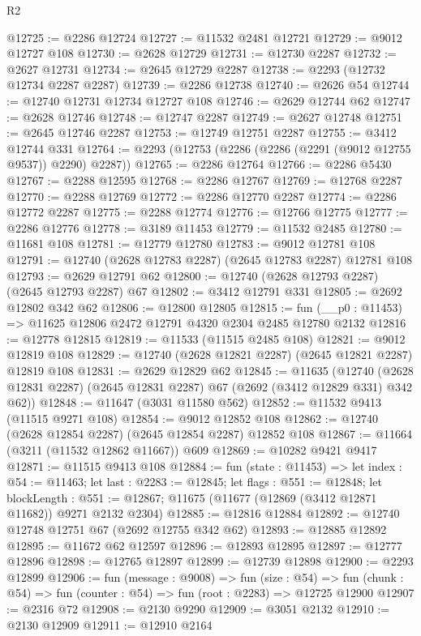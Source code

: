 \begin{lexlean}{R2}
\begin{coremodule}
@12725 := @2286 @12724
@12727 := @11532 @2481 @12721
@12729 := @9012 @12727 @108
@12730 := @2628 @12729
@12731 := @12730 @2287
@12732 := @2627 @12731
@12734 := @2645 @12729 @2287
@12738 := @2293 (@12732 @12734 @2287 @2287)
@12739 := @2286 @12738
@12740 := @2626 @54
@12744 := @12740 @12731 @12734 @12727 @108
@12746 := @2629 @12744 @62
@12747 := @2628 @12746
@12748 := @12747 @2287
@12749 := @2627 @12748
@12751 := @2645 @12746 @2287
@12753 := @12749 @12751 @2287
@12755 := @3412 @12744 @331
@12764 := @2293 (@12753 (@2286 (@2286 (@2291 (@9012 @12755 @9537)) @2290) @2287))
@12765 := @2286 @12764
@12766 := @2286 @5430
@12767 := @2288 @12595
@12768 := @2286 @12767
@12769 := @12768 @2287
@12770 := @2288 @12769
@12772 := @2286 @12770 @2287
@12774 := @2286 @12772 @2287
@12775 := @2288 @12774
@12776 := @12766 @12775
@12777 := @2286 @12776
@12778 := @3189 @11453
@12779 := @11532 @2485
@12780 := @11681 @108
@12781 := @12779 @12780
@12783 := @9012 @12781 @108
@12791 := @12740 (@2628 @12783 @2287) (@2645 @12783 @2287) @12781 @108
@12793 := @2629 @12791 @62
@12800 := @12740 (@2628 @12793 @2287) (@2645 @12793 @2287) @67
@12802 := @3412 @12791 @331
@12805 := @2692 @12802 @342 @62
@12806 := @12800 @12805
@12815 := fun (__p0 : @11453) => @11625 @12806 @2472 @12791 @4320 @2304 @2485 @12780 @2132
@12816 := @12778 @12815
@12819 := @11533 (@11515 @2485 @108)
@12821 := @9012 @12819 @108
@12829 := @12740 (@2628 @12821 @2287) (@2645 @12821 @2287) @12819 @108
@12831 := @2629 @12829 @62
@12845 := @11635
    (@12740 (@2628 @12831 @2287) (@2645 @12831 @2287) @67 (@2692 (@3412 @12829 @331) @342 @62))
@12848 := @11647 (@3031 @11580 @562)
@12852 := @11532 @9413 (@11515 @9271 @108)
@12854 := @9012 @12852 @108
@12862 := @12740 (@2628 @12854 @2287) (@2645 @12854 @2287) @12852 @108
@12867 := @11664 (@3211 (@11532 @12862 @11667)) @609
@12869 := @10282 @9421 @9417
@12871 := @11515 @9413 @108
@12884 := fun (state : @11453) =>
  let index : @54 := @11463;
  let last : @2283 := @12845;
  let flags : @551 := @12848;
  let blockLength : @551 := @12867; @11675 (@11677 (@12869 (@3412 @12871 @11682)) @9271 @2132 @2304)
@12885 := @12816 @12884
@12892 := @12740 @12748 @12751 @67 (@2692 @12755 @342 @62)
@12893 := @12885 @12892
@12895 := @11672 @62 @12597
@12896 := @12893 @12895
@12897 := @12777 @12896
@12898 := @12765 @12897
@12899 := @12739 @12898
@12900 := @2293 @12899
@12906 := fun (message : @9008) =>
  fun (size : @54) =>
  fun (chunk : @54) => fun (counter : @54) => fun (root : @2283) => @12725 @12900
@12907 := @2316 @72
@12908 := @2130 @9290
@12909 := @3051 @2132
@12910 := @2130 @12909
@12911 := @12910 @2164

\end{coremodule}
\end{lexlean}
